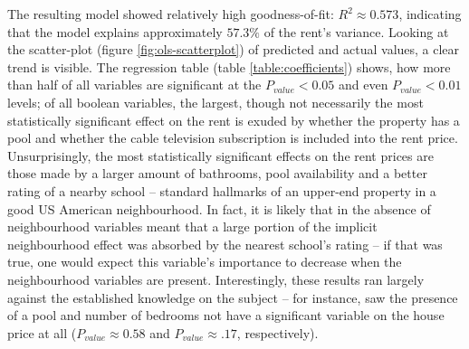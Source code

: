 \documentclass[12pt]{report}
\begin{document}
The resulting model showed relatively high goodness-of-fit: $R^2\approx0.573$, indicating that the model explains approximately $57.3\%$ of the rent's variance. Looking at the scatter-plot (figure \ref{fig:ols-scatterplot}) of predicted and actual values, a clear trend is visible. The regression table (table \ref{table:coefficients}) shows, how more than half of all variables are significant at the $P_{value}<0.05$ and even $P_{value}<0.01$ levels; of all boolean variables, the largest, though not necessarily the most statistically significant effect on the rent is exuded by whether the property has a pool and whether the cable television subscription is included into the rent price. Unsurprisingly, the most statistically significant effects on the rent prices are those made by a larger amount of bathrooms, pool availability and a better rating of a nearby school -- standard hallmarks of an upper-end property in a good US American neighbourhood. In fact, it is likely that in the absence of neighbourhood variables meant that a large portion of the implicit neighbourhood effect was absorbed by the nearest school's rating -- if that was true, one would expect this variable's importance to decrease when the neighbourhood variables are present. Interestingly, these results ran largely against the established knowledge on the subject -- for instance, \textcite{zietz2008} saw the presence of a pool and number of bedrooms not have a significant variable on the house price at all ($P_{value}\approx 0.58$ and $P_{value}\approx .17$, respectively).
\end{document}
